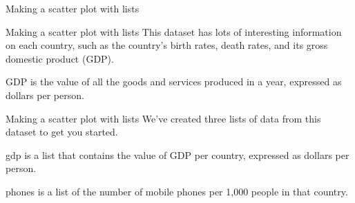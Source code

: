\documentclass[
  ignorenonframetext,
]{beamer}
\newenvironment{Shaded}{\begin{snugshade}}{\end{snugshade}}
\newcommand{\BuiltInTok}[1]{#1}
\newcommand{\CommentTok}[1]{\textcolor[rgb]{0.56,0.35,0.01}{\textit{#1}}}
\newcommand{\ControlFlowTok}[1]{\textcolor[rgb]{0.13,0.29,0.53}{\textbf{#1}}}
\newcommand{\KeywordTok}[1]{\textcolor[rgb]{0.13,0.29,0.53}{\textbf{#1}}}
\newcommand{\NormalTok}[1]{#1}
\newcommand{\OperatorTok}[1]{\textcolor[rgb]{0.81,0.36,0.00}{\textbf{#1}}}
\newcommand{\StringTok}[1]{\textcolor[rgb]{0.31,0.60,0.02}{#1}}
\begin{document}
\begin{frame}[fragile]{Making a scatter plot with lists}
\label{making-a-scatter-plot-with-lists-1}

\begin{Shaded}
\end{Shaded}
\end{frame}

\begin{frame}{Making a scatter plot with lists}
\label{making-a-scatter-plot-with-lists-2}
This dataset has lots of interesting information on each country, such
as the country's birth rates, death rates, and its gross domestic
product (GDP).

GDP is the value of all the goods and services produced in a year,
expressed as dollars per person.
\end{frame}

\begin{frame}{Making a scatter plot with lists}
\label{making-a-scatter-plot-with-lists-3}
We've created three lists of data from this dataset to get you started.

gdp is a list that contains the value of GDP per country, expressed as
dollars per person.

phones is a list of the number of mobile phones per 1,000 people in that
country.
\end{frame}
\end{document}
